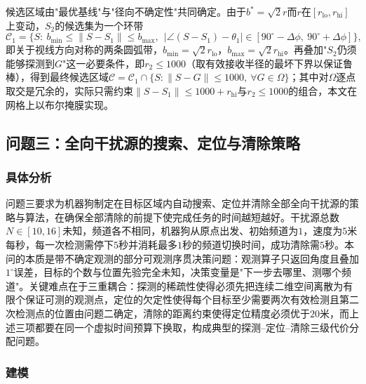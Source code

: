 \documentclass[12pt,a4paper]{ctexart}
\begin{document}
候选区域由"最优基线"与"径向不确定性"共同确定。由于$b^{\ast}=\sqrt2 r$而$r$在$[r_{\mathrm{lo}},r_{\mathrm{hi}}]$上变动，$S_2$的候选集为一个环带
\begin{equation}
\mathcal{C}_1=\{S:\ b_{\min}\le\lVert S-S_1\rVert\le b_{\max},\ \ \lvert\angle(S-S_1)-\theta_1\rvert\in[90^\circ-\Delta\phi,\ 90^\circ+\Delta\phi]\},
\label{eq:candidate}
\end{equation}
即关于视线方向对称的两条圆弧带，$b_{\min}=\sqrt2 r_{\mathrm{lo}}$，$b_{\max}=\sqrt2 r_{\mathrm{hi}}$。再叠加"$S_2$仍须能够探测到$G$"这一必要条件，即$r_2\le1000$（取有效接收半径的最坏下界以保证鲁棒），得到最终候选区域$\mathcal{C}=\mathcal{C}_1\cap\{S:\lVert S-G\rVert\le1000,\ \forall G\in\Omega\}$；其中对$\Omega$逐点取交是冗余的，实际只需约束$\lVert S-S_1\rVert\le1000+r_{\mathrm{hi}}$与$r_2\le1000$的组合，本文在网格上以布尔掩膜实现。

\subsection{问题三：全向干扰源的搜索、定位与清除策略}

\subsubsection{具体分析}

问题三要求为机器狗制定在目标区域内自动搜索、定位并清除全部全向干扰源的策略与算法，在确保全部清除的前提下使完成任务的时间越短越好。干扰源总数$N\in[10,16]$未知，频道各不相同，机器狗从原点出发、初始频道为$1$，速度为$5$米每秒，每一次检测需停下$5$秒并消耗最多$1$秒的频道切换时间，成功清除需$5$秒。本问的本质是带不确定观测的部分可观测序贯决策问题：观测算子只返回角度且叠加$1^\circ$误差，目标的个数与位置先验完全未知，决策变量是"下一步去哪里、测哪个频道"。关键难点在于三重耦合：探测的稀疏性使得必须先把连续二维空间离散为有限个保证可测的观测点，定位的欠定性使得每个目标至少需要两次有效检测且第二次检测点的位置由问题二确定，清除的距离约束使得定位精度必须优于$20$米，而上述三项都要在同一个虚拟时间预算下换取，构成典型的探测--定位--清除三级代价分配问题。

\subsubsection{建模}
\end{document}
